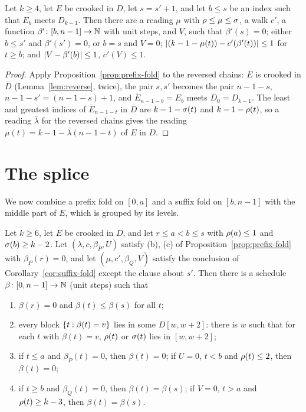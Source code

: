 
\begin{corollary}\label{cor:suffix-fold}
Let $k\ge4$, let $E$ be crooked in $D$, let $s=s'+1$, and let $b\le s$ be an index such that $E_b$ meets $D_{k-1}$. Then there are a
reading $\mu$ with $\rho\le\mu\le\sigma$, a walk $c'$, a function $\beta'\colon[b,n-1]\to\mathbb{N}$ with unit steps, and $V$, such that
$\beta'(s)=0$; either $b\le s'$ and $\beta'(s')=0$, or $b=s$ and $V=0$; $\left\lvert (k-1-\mu(t))-c'(\beta'(t))\right\rvert\le1$ for $t\ge b$; and
$\left\lvert V-\beta'(b)\right\rvert\le1$, $c'(V)\le1$.
\end{corollary}

\begin{proof}
Apply Proposition~\ref{prop:prefix-fold} to the reversed chains: $\overline E$ is crooked in $\overline D$ (Lemma~\ref{lem:reverse},
twice), the pair $s,s'$ becomes the pair $n-1-s$, $n-1-s'=(n-1-s)+1$, and $\overline E_{n-1-b}=E_b$ meets $\overline D_0=D_{k-1}$. The
least and greatest indices of $\overline E_{n-1-t}$ in $\overline D$ are $k-1-\sigma(t)$ and $k-1-\rho(t)$, so a reading $\bar\lambda$ for the
reversed chains gives the reading $\mu(t)=k-1-\bar\lambda(n-1-t)$ of $E$ in $D$.
\end{proof}


\section{The splice}\label{sec:fold-splice}

We now combine a prefix fold on $[0,a]$ and a suffix fold on $[b,n-1]$ with the middle part of $E$, which is grouped by its levels.

\begin{proposition}[Splice]\label{prop:splice}
Let $k\ge6$, let $E$ be crooked in $D$, and let $r\le a<b\le s$ with $\rho(a)\le1$ and $\sigma(b)\ge k-2$. Let
$(\lambda,c,\beta_P,U)$ satisfy (b), (c) of Proposition~\ref{prop:prefix-fold} with $\beta_P(r)=0$, and let $(\mu,c',\beta_Q,V)$ satisfy
the conclusion of Corollary~\ref{cor:suffix-fold} except the clause about $s'$. Then there is a schedule $\beta\colon[0,n-1]\to\mathbb{N}$ (unit
steps) such that
\begin{enumerate}[label=(\alph*)]
\item $\beta(r)=0$ and $\beta(t)\le\beta(s)$ for all $t$;
\item every block $\left\{ t:\beta(t)=v \right\}$ lies in some $D[w,w+2]$: there is $w$ such that for each $t$ with $\beta(t)=v$, $\rho(t)$ or $\sigma(t)$
lies in $[w,w+2]$;
\item if $t\le a$ and $\beta_P(t)=0$, then $\beta(t)=0$; if $U=0$, $t<b$ and $\rho(t)\le2$, then $\beta(t)=0$;
\item if $t\ge b$ and $\beta_Q(t)=0$, then $\beta(t)=\beta(s)$; if $V=0$, $t>a$ and $\rho(t)\ge k-3$, then $\beta(t)=\beta(s)$.
\end{enumerate}
\end{proposition}

